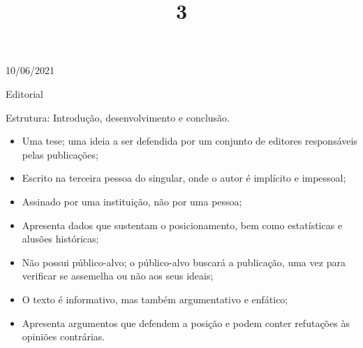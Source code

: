 \documentclass{SchoolBook}
\begin{document}
    \begin{day}{10/06/2021}
        \title{3}{Editorial}
        
        Estrutura: Introdução, desenvolvimento e conclusão.
        
        \begin{itemize}[nosep]
            \item Uma tese; uma ideia a ser defendida por um conjunto de editores responsáveis pelas publicações;
            \item Escrito na terceira pessoa do singular, onde o autor é implícito e impessoal;
            \item Assinado por uma instituição, não por uma pessoa;
            \item Apresenta dados que sustentam o posicionamento, bem como estatísticas e alusões históricas;
            \vspace{6pt}
            \item Não possui público-alvo; o público-alvo buscará a publicação, uma vez para verificar se assemelha ou não aos seus ideais;
            \item O texto é informativo, mas também argumentativo e enfático;
            \item Apresenta argumentos que defendem a posição e podem conter refutações às opiniões contrárias.
        \end{itemize}
    \end{day}
\end{document}

